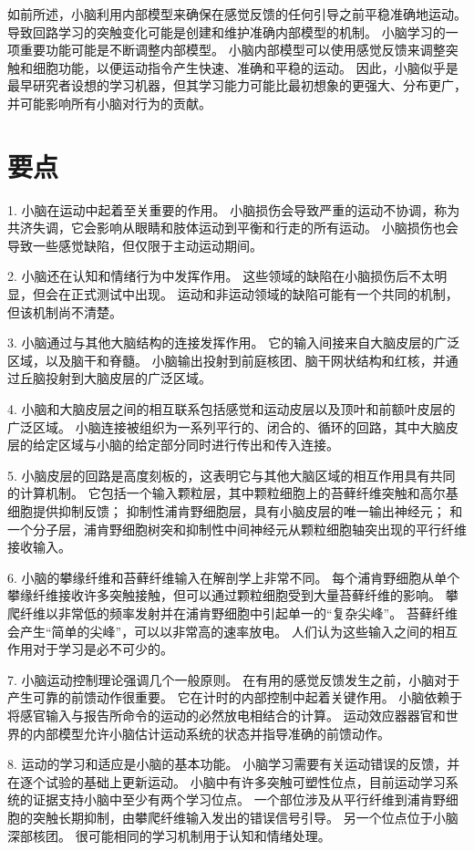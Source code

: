 如前所述，小脑利用内部模型来确保在感觉反馈的任何引导之前平稳准确地运动。
导致回路学习的突触变化可能是创建和维护准确内部模型的机制。
小脑学习的一项重要功能可能是不断调整内部模型。
小脑内部模型可以使用感觉反馈来调整突触和细胞功能，以便运动指令产生快速、准确和平稳的运动。
因此，小脑似乎是最早研究者设想的学习机器，但其学习能力可能比最初想象的更强大、分布更广，并可能影响所有小脑对行为的贡献。



\section{要点}

1. 小脑在运动中起着至关重要的作用。
小脑损伤会导致严重的运动不协调，称为共济失调，它会影响从眼睛和肢体运动到平衡和行走的所有运动。
小脑损伤也会导致一些感觉缺陷，但仅限于主动运动期间。


2. 小脑还在认知和情绪行为中发挥作用。
这些领域的缺陷在小脑损伤后不太明显，但会在正式测试中出现。
运动和非运动领域的缺陷可能有一个共同的机制，但该机制尚不清楚。


3. 小脑通过与其他大脑结构的连接发挥作用。
它的输入间接来自大脑皮层的广泛区域，以及脑干和脊髓。
小脑输出投射到前庭核团、脑干网状结构和红核，并通过丘脑投射到大脑皮层的广泛区域。


4. 小脑和大脑皮层之间的相互联系包括感觉和运动皮层以及顶叶和前额叶皮层的广泛区域。
小脑连接被组织为一系列平行的、闭合的、循环的回路，其中大脑皮层的给定区域与小脑的给定部分同时进行传出和传入连接。


5. 小脑皮层的回路是高度刻板的，这表明它与其他大脑区域的相互作用具有共同的计算机制。
它包括一个输入颗粒层，其中颗粒细胞上的苔藓纤维突触和高尔基细胞提供抑制反馈；
抑制性浦肯野细胞层，具有小脑皮层的唯一输出神经元；
和一个分子层，浦肯野细胞树突和抑制性中间神经元从颗粒细胞轴突出现的平行纤维接收输入。


6. 小脑的攀缘纤维和苔藓纤维输入在解剖学上非常不同。
每个浦肯野细胞从单个攀缘纤维接收许多突触接触，但可以通过颗粒细胞受到大量苔藓纤维的影响。
攀爬纤维以非常低的频率发射并在浦肯野细胞中引起单一的“复杂尖峰”。
苔藓纤维会产生“简单的尖峰”，可以以非常高的速率放电。
人们认为这些输入之间的相互作用对于学习是必不可少的。


7. 小脑运动控制理论强调几个一般原则。
在有用的感觉反馈发生之前，小脑对于产生可靠的前馈动作很重要。
它在计时的内部控制中起着关键作用。
小脑依赖于将感官输入与报告所命令的运动的必然放电相结合的计算。
运动效应器器官和世界的内部模型允许小脑估计运动系统的状态并指导准确的前馈动作。


8. 运动的学习和适应是小脑的基本功能。
小脑学习需要有关运动错误的反馈，并在逐个试验的基础上更新运动。
小脑中有许多突触可塑性位点，目前运动学习系统的证据支持小脑中至少有两个学习位点。
一个部位涉及从平行纤维到浦肯野细胞的突触长期抑制，由攀爬纤维输入发出的错误信号引导。
另一个位点位于小脑深部核团。
很可能相同的学习机制用于认知和情绪处理。



